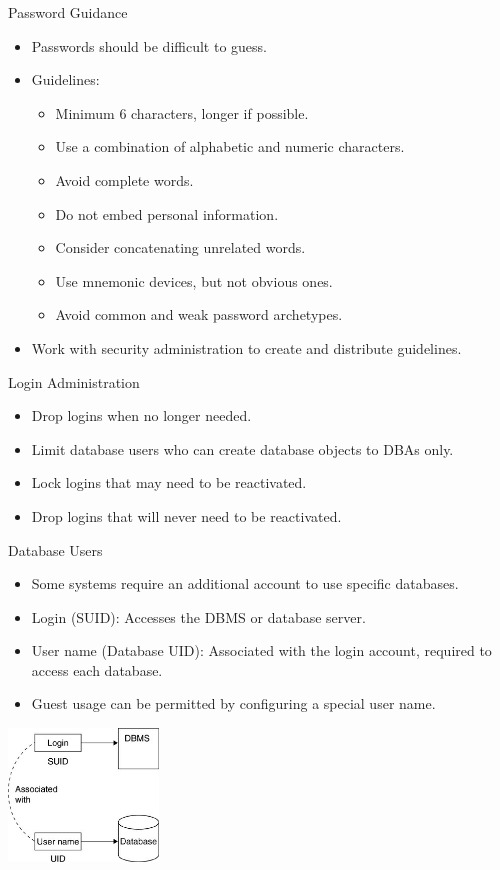 \documentclass{beamer}
\begin{document}
\begin{frame}{Password Guidance}
  \begin{itemize}
    \item Passwords should be difficult to guess.
    \item Guidelines:
      \begin{itemize}
        \item Minimum 6 characters, longer if possible.
        \item Use a combination of alphabetic and numeric characters.
        \item Avoid complete words.
        \item Do not embed personal information.
        \item Consider concatenating unrelated words.
        \item Use mnemonic devices, but not obvious ones.
        \item Avoid common and weak password archetypes.
      \end{itemize}
    \item Work with security administration to create and distribute guidelines.
  \end{itemize}
\end{frame}

\begin{frame}{Login Administration}
    \begin{itemize}
        \item Drop logins when no longer needed.
        \item Limit database users who can create database objects to DBAs only.
        \item Lock logins that may need to be reactivated.
        \item Drop logins that will never need to be reactivated.
    \end{itemize}
\end{frame}

\begin{frame}{Database Users}
    \begin{itemize}
        \item Some systems require an additional account to use specific databases.
        \item Login (SUID): Accesses the DBMS or database server.
        \item User name (Database UID): Associated with the login account, required to access each database.
        \item Guest usage can be permitted by configuring a special user name.
    \end{itemize}
    \centering
    \includegraphics[width=0.3\textwidth]{figures/user_name.png}
\end{frame}
\end{document}
